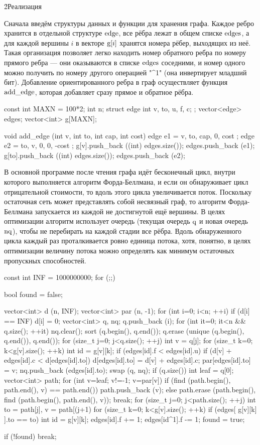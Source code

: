 \h2{Реализация}

Сначала введём структуры данных и функции для хранения графа. Каждое ребро хранится в отдельной структуре $\rm edge$, все рёбра лежат в общем списке $\rm edges$, а для каждой вершины $i$ в векторе ${\rm g}[i]$ хранятся номера рёбер, выходящих из неё. Такая организация позволяет легко находить номер обратного ребра по номеру прямого ребра --- они оказываются в списке $\rm edges$ соседними, и номер одного можно получить по номеру другого операцией "^1" (она инвертирует младший бит). Добавление ориентированного ребра в граф осуществляет функция $\rm add\_edge$, которая добавляет сразу прямое и обратное рёбра.

\code
const int MAXN = 100*2;
int n;
struct edge {
	int v, to, u, f, c;
};
vector<edge> edges;
vector<int> g[MAXN];

void add_edge (int v, int to, int cap, int cost) {
	edge e1 = { v, to, cap, 0, cost };
	edge e2 = { to, v, 0, 0, -cost };
	g[v].push_back ((int) edges.size());
	edges.push_back (e1);
	g[to].push_back ((int) edges.size());
	edges.push_back (e2);
}
\endcode

В основной программе после чтения графа идёт бесконечный цикл, внутри которого выполняется алгоритм Форда-Беллмана, и если он обнаруживает цикл отрицательной стоимости, то вдоль этого цикла увеличивается поток. Поскольку остаточная сеть может представлять собой несвязный граф, то алгоритм Форда-Беллмана запускается из каждой не достигнутой ещё вершины. В целях оптимизации алгоритм использует очередь (текущая очередь $\rm q$ и новая очередь $\rm nq$), чтобы не перебирать на каждой стадии все рёбра. Вдоль обнаруженного цикла каждый раз проталкивается ровно единица потока, хотя, понятно, в целях оптимизации величину потока можно определять как минимум остаточных пропускных способностей.

\code
const int INF = 1000000000;
for (;;) {
	bool found = false;

	vector<int> d (n, INF);
	vector<int> par (n, -1);
	for (int i=0; i<n; ++i)
		if (d[i] == INF) {
			d[i] = 0;
			vector<int> q, nq;
			q.push_back (i);
			for (int it=0; it<n && q.size(); ++it) {
				nq.clear();
				sort (q.begin(), q.end());
				q.erase (unique (q.begin(), q.end()), q.end());
				for (size_t j=0; j<q.size(); ++j) {
					int v = q[j];
					for (size_t k=0; k<g[v].size(); ++k) {
						int id = g[v][k];
						if (edges[id].f < edges[id].u)
							if (d[v] + edges[id].c < d[edges[id].to]) {
								d[edges[id].to] = d[v] + edges[id].c;
								par[edges[id].to] = v;
								nq.push_back (edges[id].to);
							}
					}
				}
				swap (q, nq);
			}
			if (q.size()) {
				int leaf = q[0];
				vector<int> path;
				for (int v=leaf; v!=-1; v=par[v])
					if (find (path.begin(), path.end(), v) == path.end())
						path.push_back (v);
					else {
						path.erase (path.begin(), find (path.begin(), path.end(), v));
						break;
					}
				for (size_t j=0; j<path.size(); ++j) {
					int to = path[j],  v = path[(j+1)%
					for (size_t k=0; k<g[v].size(); ++k)
						if (edges[ g[v][k] ].to == to) {
							int id = g[v][k];
							edges[id].f += 1;
							edges[id^1].f -= 1;
						}
				}
				found = true;
			}
		}

	if (!found)  break;
}
\endcode

